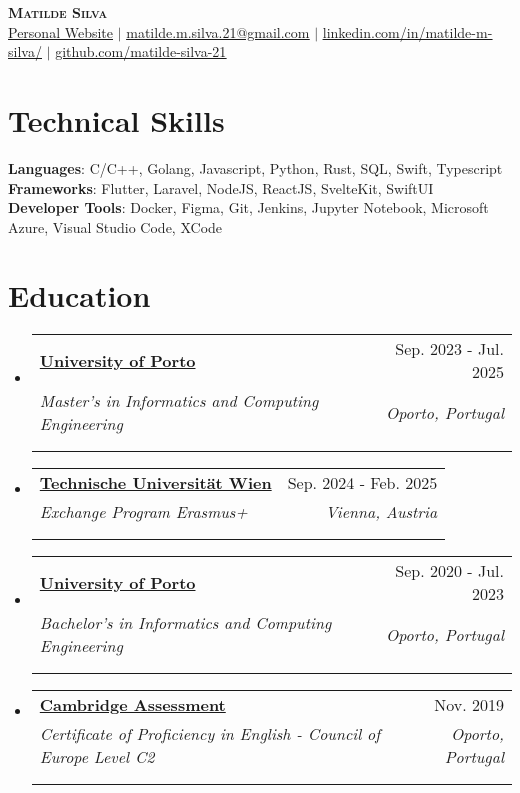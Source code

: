 \documentclass[a4paper,11pt]{article}
\makeatletter
\newcommand{\resumeSubheading}[5]{
  \vspace{-2pt}\item
    \begin{tabular*}{0.97\textwidth}[t]{l@{\extracolsep{\fill}}r}
      \textbf{#1} & #2 \\
      \textit{\small#3} & \textit{\small #4} \\
      \if\relax\detokenize{#5}\relax
      \else
        \multicolumn{2}{@{}l}{\textit{\small#5}} \\
      \fi
    \end{tabular*}\vspace{-7pt}
}
\newcommand{\resumeSubHeadingListStart}{\begin{itemize}[leftmargin=0.15in, label={}]}
\newcommand{\resumeSubHeadingListEnd}{\end{itemize}}
\makeatother
\begin{document}

\begin{center}
    \textbf{\Huge \scshape Matilde Silva} \\ \vspace{10pt}
    \small \href{https://matilde-silva-21.github.io/}{\uline{Personal Website}} $|$ \href{mailto:x@x.com}{\uline{matilde.m.silva.21@gmail.com}} $|$ 
    \href{https://www.linkedin.com/in/matilde-m-silva/}{\uline{linkedin.com/in/matilde-m-silva/}} $|$
    \href{https://github.com/matilde-silva-21}{\uline{github.com/matilde-silva-21}}
\end{center}


\section{Technical Skills}
 \begin{itemize}[leftmargin=0.15in, label={}]
    \small{\item{
     \textbf{Languages}{: C/C++, Golang, Javascript, Python, Rust, SQL, Swift, Typescript} \\
     \textbf{Frameworks}{: Flutter, Laravel, NodeJS, ReactJS, SvelteKit, SwiftUI} \\
     \textbf{Developer Tools}{: Docker, Figma, Git, Jenkins, Jupyter Notebook, Microsoft Azure, Visual Studio Code, XCode}
    }}
 \end{itemize}

\section{Education}
  \resumeSubHeadingListStart
      \resumeSubheading
      {\href{https://sigarra.up.pt/feup/en/WEB_PAGE.INICIAL}{University of Porto}}{Sep. 2023 - Jul. 2025}
      {Master’s in Informatics and Computing Engineering}{Oporto, Portugal}
      {Current Grade: 16/20}
    \resumeSubheading
      {\href{https://informatics.tuwien.ac.at/}{Technische Universität Wien}}{Sep. 2024 - Feb. 2025}
      {Exchange Program Erasmus+}{Vienna, Austria}
      {}
    \resumeSubheading
      {\href{https://sigarra.up.pt/feup/en/WEB_PAGE.INICIAL}{University of Porto}}{Sep. 2020 - Jul. 2023}
      {Bachelor’s in Informatics and Computing Engineering}{Oporto, Portugal}
      {Final Grade: 15/20}
	\resumeSubheading
      {\href{https://www.cambridgeenglish.org/}{Cambridge Assessment}}{Nov. 2019}
      {Certificate of Proficiency in English - Council of Europe Level C2}{Oporto, Portugal}
      {Final Grade: 218/230}
  \resumeSubHeadingListEnd
\leavevmode \\ %
\end{document}
